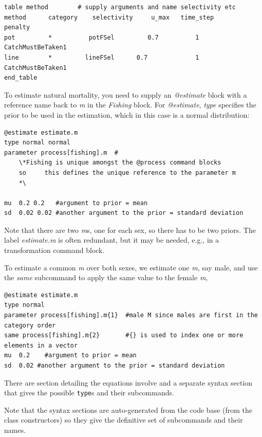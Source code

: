 {\small{\begin{verbatim}
table method        # supply arguments and name selectivity etc
method  	category 	selectivity 	u_max 	time_step 		penalty
pot        	*  	       potFSel		   0.7 			1 	CatchMustBeTaken1
line     	*  	      lineFSel 	    0.7 			1 	CatchMustBeTaken1
end_table
\end{verbatim}}}

To estimate natural mortality, you need to supply an \textit{@estimate} block with a reference name back to \textit{m} in the \textit{Fishing} block. For \textit{@estimate}, \textit{type} specifies the prior to be used in the estimation, which in this case is a normal distribution:

{\small{\begin{verbatim}
@estimate estimate.m
type normal normal
parameter process[fishing].m  #
    \*Fishing is unique amongst the @process command blocks
    so     this defines the unique reference to the parameter m
    *\

mu  0.2 0.2   #argument to prior = mean
sd  0.02 0.02 #another argument to the prior = standard deviation
\end{verbatim}}}

Note that there are two \textit{m}s, one for each sex, so there has to be two priors. The \textit{\@estiamte} label \textit{estimate.m} is often redundant, but it may be needed, e.g., in a transformation command block.

To estimate a common \textit{m} over both sexes, we estimate one \textit{m}, say male, and use the \textit{same} subcommand to apply the same value to the female \textit{m},

{\small{\begin{verbatim}
@estimate estimate.m
type normal 
parameter process[fishing].m{1}  #male M since males are first in the category order
same process[fishing].m{2}       #{} is used to index one or more elements in a vector
mu  0.2    #argument to prior = mean
sd  0.02 #another argument to the prior = standard deviation
\end{verbatim}}}

There are section detailing the equations involve and a separate syntax section that gives the possible \texttt{type}s and their subcommands.

Note that the syntax sections are auto-generated from the code base (from the class constructors) so they give the definitive set of subcommands and their names. 

\subsection{\label{sec:SingleStepping}}

